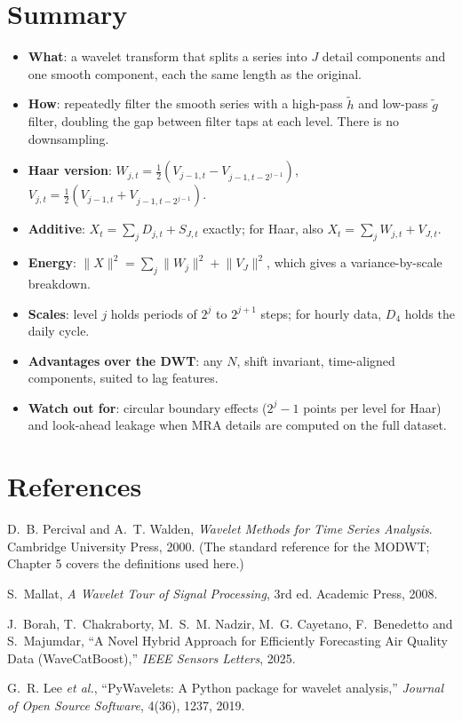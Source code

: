 \documentclass[11pt,a4paper]{article}
\newcommand{\hwav}{\tilde{h}}
\newcommand{\gsc}{\tilde{g}}
\begin{document}
\section{Summary}

\begin{keybox}
\begin{itemize}[leftmargin=1.2em]
  \item \textbf{What}: a wavelet transform that splits a series into $J$ detail components and one smooth component,
        each the same length as the original.
  \item \textbf{How}: repeatedly filter the smooth series with a high-pass $\hwav$ and low-pass $\gsc$ filter, doubling the
        gap between filter taps at each level. There is no downsampling.
  \item \textbf{Haar version}: $W_{j,t}=\tfrac12(V_{j-1,t}-V_{j-1,t-2^{j-1}})$, \; $V_{j,t}=\tfrac12(V_{j-1,t}+V_{j-1,t-2^{j-1}})$.
  \item \textbf{Additive}: $X_t=\sum_j D_{j,t}+S_{J,t}$ exactly; for Haar, also $X_t=\sum_j W_{j,t}+V_{J,t}$.
  \item \textbf{Energy}: $\lVert X\rVert^2=\sum_j\lVert W_j\rVert^2+\lVert V_J\rVert^2$, which gives a variance-by-scale breakdown.
  \item \textbf{Scales}: level $j$ holds periods of $2^j$ to $2^{j+1}$ steps; for hourly data, $D_4$ holds the daily cycle.
  \item \textbf{Advantages over the DWT}: any $N$, shift invariant, time-aligned components, suited to lag features.
  \item \textbf{Watch out for}: circular boundary effects ($2^j-1$ points per level for Haar) and look-ahead leakage when MRA
        details are computed on the full dataset.
\end{itemize}
\end{keybox}

\section*{References}

\begin{enumerate}[label={[\arabic*]},leftmargin=2em]
  \item D.~B. Percival and A.~T. Walden, \emph{Wavelet Methods for Time Series Analysis}. Cambridge University Press, 2000.
        (The standard reference for the MODWT; Chapter 5 covers the definitions used here.)
  \item S.~Mallat, \emph{A Wavelet Tour of Signal Processing}, 3rd ed. Academic Press, 2008.
  \item J.~Borah, T.~Chakraborty, M.~S.~M. Nadzir, M.~G. Cayetano, F.~Benedetto and S.~Majumdar,
        ``A Novel Hybrid Approach for Efficiently Forecasting Air Quality Data (WaveCatBoost),''
        \emph{IEEE Sensors Letters}, 2025.
  \item G.~R. Lee \emph{et al.}, ``PyWavelets: A Python package for wavelet analysis,''
        \emph{Journal of Open Source Software}, 4(36), 1237, 2019.
\end{enumerate}
\end{document}
